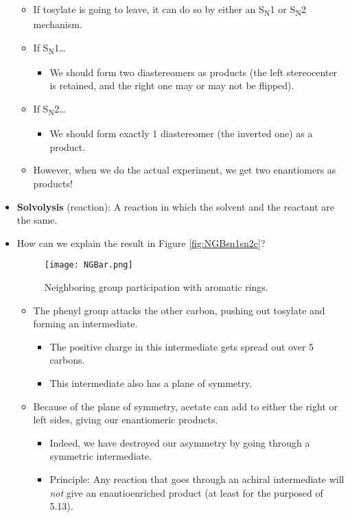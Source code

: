 \documentclass[../notes.tex]{subfiles}
\begin{document}
\begin{itemize}
\begin{itemize}
        \item If tosylate is going to leave, it can do so by either an S\textsubscript{N}1 or S\textsubscript{N}2 mechanism.
        \item If S\textsubscript{N}1\dots
        \begin{itemize}
            \item We should form two diastereomers as products (the left stereocenter is retained, and the right one may or may not be flipped).
        \end{itemize}
        \item If S\textsubscript{N}2\dots
        \begin{itemize}
            \item We should form exactly 1 diastereomer (the inverted one) as a product.
        \end{itemize}
        \item However, when we do the actual experiment, we get two enantiomers as products!
    \end{itemize}
    \item \textbf{Solvolysis} (reaction): A reaction in which the solvent and the reactant are the same.
    \item How can we explain the result in Figure \ref{fig:NGBsn1sn2c}?
    \begin{figure}[H]
        \centering
        \texttt{[image: NGBar.png]}
        \caption{Neighboring group participation with aromatic rings.}
        \label{fig:NGBar}
    \end{figure}
    \begin{itemize}
        \item The phenyl group attacks the other carbon, pushing out tosylate and forming an intermediate.
        \begin{itemize}
            \item The positive charge in this intermediate gets spread out over 5 carbons.
            \item This intermediate also has a plane of symmetry.
        \end{itemize}
        \item Because of the plane of symmetry, acetate can add to either the right or left sides, giving our enantiomeric products.
        \begin{itemize}
            \item Indeed, we have destroyed our asymmetry by going through a symmetric intermediate.
            \item Principle: Any reaction that goes through an achiral intermediate will \emph{not} give an enantioenriched product (at least for the purposed of 5.13).

\end{itemize}
\end{itemize}
\end{itemize}
\end{document}
